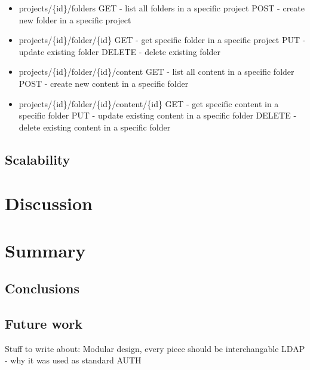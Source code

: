 \documentclass[a4paper,12pt]{article}
\begin{document}
\begin{itemize}
  \item projects/\{id\}/folders
      \subitem GET - list all folders in a specific project
      \subitem POST - create new folder in a specific project 
  \item projects/\{id\}/folder/\{id\}
      \subitem GET - get specific folder in a specific project
      \subitem PUT - update existing folder
      \subitem DELETE - delete existing folder
  \item projects/\{id\}/folder/\{id\}/content
      \subitem GET - list all content in a specific folder
      \subitem POST - create new content in a specific folder 
  \item projects/\{id\}/folder/\{id\}/content/\{id\}
      \subitem GET - get specific content in a specific folder
      \subitem PUT - update existing content in a specific folder
      \subitem DELETE - delete existing content in a specific folder
\end{itemize}

\subsection{Scalability}

\section{Discussion}

\section{Summary}
\subsection{Conclusions}

\subsection{Future work}

Stuff to write about:
Modular design, every piece should be interchangable
LDAP - why it was used as standard AUTH


\newpage


\end{document}
